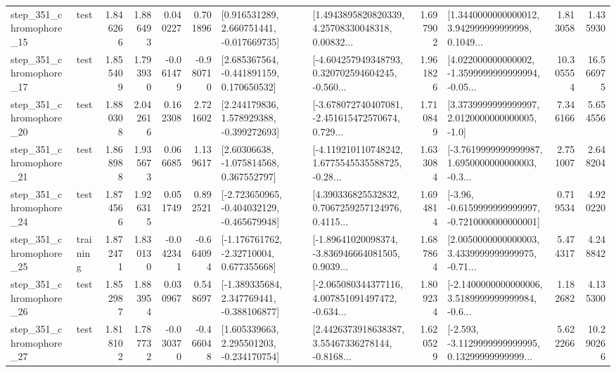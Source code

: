 \begin{tabular}{llrrrrllrlrr}
  step\_351\_chromophore\_15 &      test &      1.846266 &    1.886493 &      0.040227 &  0.701896 &    [0.916531289, 2.660751441, -0.017669735] &  [1.4943895820820339, 4.25708330048318, 0.00832... &       1.697902 &  [1.3440000000000012, 3.942999999999998, 0.1049... &            1.813058 &          1.435930 \\
  step\_351\_chromophore\_17 &      test &      1.855409 &    1.793930 &     -0.061479 & -0.980710 &    [2.685367564, -0.441891159, 0.170650532] &  [-4.604257949348793, 0.320702594604245, -0.560... &       1.961826 &  [4.022000000000002, -1.3599999999999994, -0.05... &           10.305554 &         16.566975 \\
  step\_351\_chromophore\_20 &      test &      1.880308 &    2.042616 &      0.162308 &  2.721602 &    [2.244179836, 1.578929388, -0.399272693] &  [-3.678072740407081, -2.451615472570674, 0.729... &       1.710849 &     [3.3739999999999997, 2.0120000000000005, -1.0] &            7.346166 &          5.654556 \\
  step\_351\_chromophore\_21 &      test &      1.868988 &    1.935673 &      0.066685 &  1.139617 &     [2.60306638, -1.075814568, 0.367552797] &  [-4.119210110748242, 1.6775545535588725, -0.28... &       1.633084 &  [-3.7619999999999987, 1.6950000000000003, -0.3... &            2.751007 &          2.648204 \\
  step\_351\_chromophore\_24 &      test &      1.874566 &    1.926315 &      0.051749 &  0.892521 &  [-2.723650965, -0.404032129, -0.465679948] &  [4.390336825532832, 0.7067259257124976, 0.4115... &       1.694814 &  [-3.96, -0.6159999999999997, -0.7210000000000001] &            0.719534 &          4.920220 \\
  step\_351\_chromophore\_25 &  training &      1.872471 &    1.830130 &     -0.042341 & -0.664094 &    [-1.176761762, -2.32710004, 0.677355668] &  [-1.89641020098374, -3.836946664081505, 0.9039... &       1.687864 &  [2.0050000000000003, 3.4339999999999975, -0.71... &            5.474317 &          4.248842 \\
  step\_351\_chromophore\_26 &      test &      1.852987 &    1.883954 &      0.030967 &  0.548697 &   [-1.389335684, 2.347769441, -0.388106877] &  [-2.065080344377116, 4.007851091497472, -0.634... &       1.809234 &  [-2.1400000000000006, 3.5189999999999984, -0.6... &            1.182682 &          4.135300 \\
  step\_351\_chromophore\_27 &      test &      1.818102 &    1.787732 &     -0.030370 & -0.466048 &    [1.605339663, 2.295501203, -0.234170754] &  [2.4426373918638387, 3.55467336278144, -0.8168... &       1.620529 &  [-2.593, -3.1129999999999995, 0.13299999999999... &            5.622266 &         10.290266 \\

\end{tabular}
